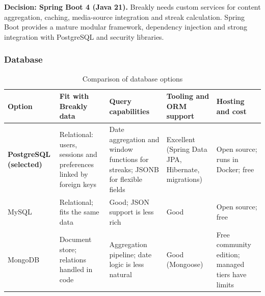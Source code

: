\noindent\textbf{Decision: Spring Boot 4 (Java 21).} Breakly needs custom services for content aggregation, caching, media-source integration and streak calculation. Spring Boot provides a mature modular framework, dependency injection and strong integration with PostgreSQL and security libraries.


\subsubsection{Database}

\begingroup

\footnotesize

\begin{longtable}{|>{\raggedright\arraybackslash}p{2.6cm}|>{\raggedright\arraybackslash}p{2.95cm}|>{\raggedright\arraybackslash}p{2.95cm}|>{\raggedright\arraybackslash}p{2.95cm}|>{\raggedright\arraybackslash}p{2.95cm}|}

\caption{Comparison of database options}\label{tab:tech-db}\\

\hline

\textbf{Option} & \textbf{Fit with Breakly data} & \textbf{Query capabilities} & \textbf{Tooling and ORM support} & \textbf{Hosting and cost} \\ \hline

\textbf{PostgreSQL (selected)} & Relational: users, sessions and preferences linked by foreign keys &

Date aggregation and window functions for streaks; JSONB for flexible fields &

Excellent (Spring Data JPA, Hibernate, migrations) &

Open source; runs in Docker; free \\ \hline

MySQL & Relational; fits the same data &

Good; JSON support is less rich &

Good &

Open source; free \\ \hline

MongoDB & Document store; relations handled in code &

Aggregation pipeline; date logic is less natural &

Good (Mongoose) &

Free community edition; managed tiers have limits \\ \hline

\end{longtable}

